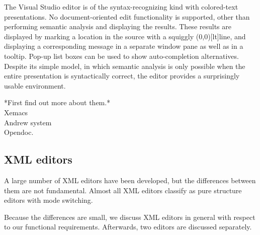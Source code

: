 \documentclass{speauth}
\begin{document}
The Visual Studio editor is of the syntax-recognizing kind with colored-text presentations. No document-oriented edit functionality is supported, other than performing semantic analysis and displaying the results. These results are displayed by marking a location in the source with a squiggly \makebox(0,0)[lt]{}line, and displaying a corresponding message in a separate window pane as well as in a tooltip. Pop-up list boxes can be used to show auto-completion alternatives. Despite its simple model, in which semantic analysis is only possible when the entire presentation is syntactically correct, the editor provides a surprisingly usable environment. 

\bc
\toHere     %


*First find out more about them.*\\
Xemacs\\
Andrew system\\
Opendoc.\\

\fromHere  %


\ec

%																
\subsection{XML editors} \label{sect:xmlEditors}

A large number of XML editors have been developed, but the differences between them are not fundamental. Almost all XML editors classify as pure structure editors with mode switching. 

Because the differences are small, we discuss XML editors in general with respect to our functional requirements. Afterwards, two  editors are discussed separately.
\end{document}
